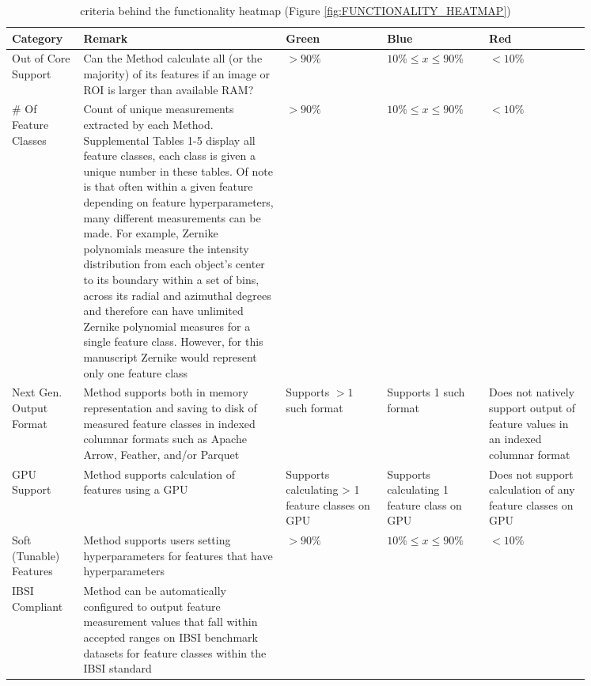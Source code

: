 \documentclass[sn-mathphys,Numbered]{sn-jnl}%
\theoremstyle{thmstyleone}%
\theoremstyle{thmstyletwo}%
\theoremstyle{thmstylethree}%
\begin{document}
\begin{table}
\centering
\caption {criteria behind the functionality heatmap (Figure \ref{fig:FUNCTIONALITY_HEATMAP})}
\label {table:FUNC_HEATMAP_CRITERIA}
\begin{tiny}
\begin{tabular} {p{0.1\linewidth} | p{0.3\linewidth} | p{0.15\linewidth} | p{0.15\linewidth} | p{0.15\linewidth}}
\toprule
 Category & Remark  & Green &  Blue &  Red \\
 \midrule
Out of Core Support
 & Can the Method calculate all (or the majority) of its features if an image or ROI is larger than available RAM?
 & $>90\%$
 & $10\% \leqslant x \leqslant 90\%$
 & $< 10\%$
 \\
 \hline
\# Of Feature Classes
 & Count of unique measurements extracted by each Method. Supplemental Tables 1-5 display all feature classes, each class is given a unique number in these tables. Of note is that often within a given feature depending on feature hyperparameters, many different measurements can be made. For example, Zernike polynomials measure the intensity distribution from each object’s center to its boundary within a set of bins, across its radial and azimuthal degrees and therefore can have unlimited Zernike polynomial measures for a single feature class. However, for this manuscript Zernike would represent only one feature class
 & $>90\%$
 & $10\% \leqslant x \leqslant 90\%$
 & $< 10\%$ \\
 \hline
Next Gen. Output Format
 & Method supports both in memory representation and saving to disk of measured feature classes in indexed columnar formats such as Apache Arrow, Feather, and/or Parquet
 & Supports $>1$ such format
 & Supports 1 such format
 & Does not natively support output of feature values in an indexed columnar format
 \\
 \hline
GPU Support
 & Method supports calculation of features using a GPU
 & Supports calculating > 1 feature classes on GPU
 & Supports calculating 1 feature class on GPU
 & Does not support calculation of any feature classes on GPU
 \\
 \hline
Soft (Tunable) Features
 & Method supports users setting hyperparameters for features that have hyperparameters
 & $>90\%$
 & $10\% \leqslant x \leqslant 90\%$
 & $< 10\%$
 \\
 \hline
IBSI Compliant
 & Method can be automatically configured to output feature measurement values that fall within accepted ranges on IBSI benchmark datasets for feature classes within the IBSI standard

\end{tabular}
\end{tiny}
\end{table}
\end{document}
